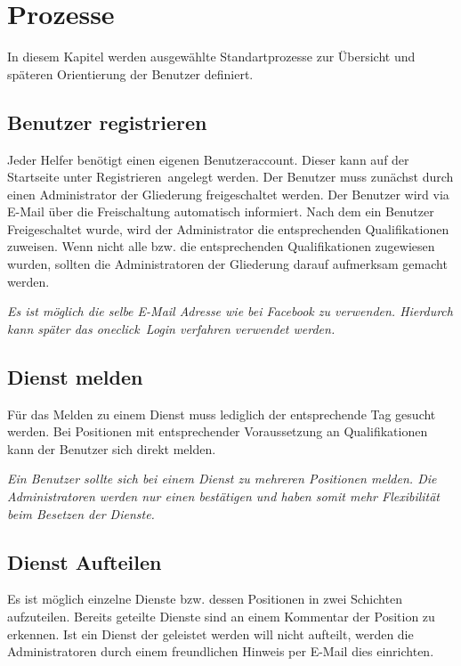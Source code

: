\chapter{Prozesse}
\label{cha:prozesse}
In diesem Kapitel werden ausgewählte Standartprozesse zur Übersicht und späteren Orientierung der Benutzer definiert.

\section{Benutzer registrieren}
\label{sec:process_register}
Jeder Helfer benötigt einen eigenen Benutzeraccount. Dieser kann auf der Startseite unter \glqq Registrieren\grqq ~angelegt werden. Der Benutzer muss zunächst durch einen Administrator der Gliederung freigeschaltet werden. Der Benutzer wird via E-Mail über die Freischaltung automatisch informiert. Nach dem ein Benutzer Freigeschaltet wurde, wird der Administrator die entsprechenden Qualifikationen zuweisen. Wenn nicht alle bzw. die entsprechenden Qualifikationen zugewiesen wurden, sollten die Administratoren der Gliederung darauf aufmerksam gemacht werden.

\noindent \textit{Es ist möglich die selbe E-Mail Adresse wie bei Facebook zu verwenden. Hierdurch kann später das \glqq oneclick\grqq ~Login verfahren verwendet werden.}

\section{Dienst melden}
\label{sec:process_position_apply}
Für das Melden zu einem Dienst muss lediglich der entsprechende Tag gesucht werden. Bei Positionen mit entsprechender Voraussetzung an Qualifikationen kann der Benutzer sich direkt melden.

\noindent \textit{Ein Benutzer sollte sich bei einem Dienst zu mehreren Positionen melden. Die Administratoren werden nur einen bestätigen und haben somit mehr Flexibilität beim Besetzen der Dienste.}

\section{Dienst Aufteilen}
\label{sec:process_service_split}
Es ist möglich einzelne Dienste bzw. dessen Positionen in zwei Schichten aufzuteilen. Bereits geteilte Dienste sind an einem Kommentar der Position zu erkennen. Ist ein Dienst der geleistet werden will nicht aufteilt, werden die Administratoren durch einem freundlichen Hinweis per E-Mail dies einrichten.

